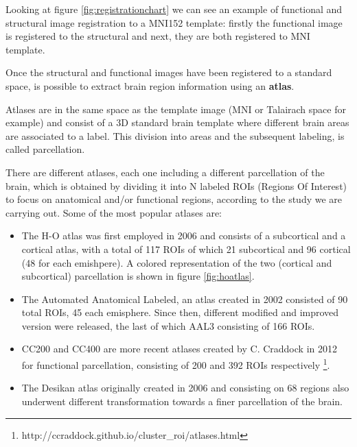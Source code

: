 \documentclass[11pt]{report}
\begin{document}
Looking at figure \ref{fig:registrationchart} we can see an example of functional and structural image registration to a MNI152 template: firstly the functional image is registered to the structural and next, they are both registered to MNI template.

Once the structural and functional images have been registered to a standard space, is possible to extract brain region information using an \textbf{atlas}.

Atlases are in the same space as the template image (MNI or Talairach space for example) and consist of a 3D standard brain template where different brain areas are associated to a label.
This division into areas and the subsequent labeling, is called parcellation.

There are different atlases, each one including a different parcellation of the brain, which is obtained by dividing it into N labeled ROIs
(Regions Of Interest) to focus on anatomical and/or functional regions, according to the study we are carrying out.
Some of the most popular atlases are:

\begin{itemize}

\item The H-O atlas was first employed in 2006 \cite{makris2006} and consists of a subcortical and a cortical atlas, with a total of 117 ROIs of which 21 subcortical and 96 cortical (48 for each emishpere). A colored representation of the two (cortical and subcortical) parcellation is shown in figure \ref{fig:hoatlas}.

\item The Automated Anatomical Labeled, an atlas created in 2002 \cite{mazoyer-2002} consisted of 90 total ROIs, 45 each emisphere. Since then, different modified and improved version were released, the last of which AAL3 consisting of 166 ROIs.

\item CC200 and CC400 are more recent atlases created by C. Craddock in 2012 \cite{craddock2012} for functional parcellation, consisting of 200 and 392 ROIs respectively \footnote{http://ccraddock.github.io/cluster\_roi/atlases.html}.

\item The Desikan atlas \cite{desikan2006} originally created in 2006 and consisting on 68 regions also underwent different transformation towards a finer parcellation of the brain.

\end{itemize}
\end{document}
